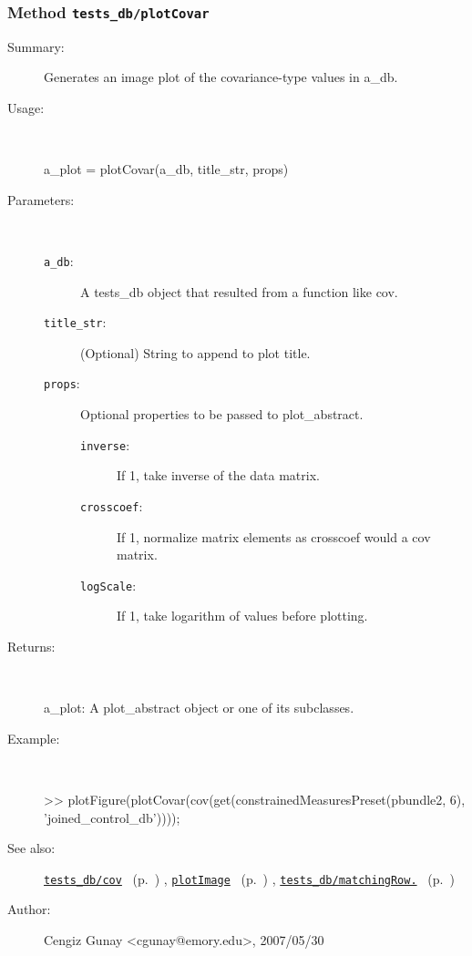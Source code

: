 \subsubsection[Method \texttt{plotCovar}]{Method \texttt{tests\_db/plotCovar}}%
%
\label{ref_tests_db__plotCovar}%
\hypertarget{ref_tests_db__plotCovar}{}%
\begin{description}
\item[Summary:]Generates an image plot of the covariance-type values in a\_db.
%
\item[Usage:]~%
\begin{lyxcode}%
a\_plot = plotCovar(a\_db, title\_str, props)
%
\end{lyxcode}%
%
%
\item[Parameters:]~
\begin{description}%
\item[\texttt{a\_db}:]
 A tests\_db object that resulted from a function like cov.
\item[\texttt{title\_str}:]
 (Optional) String to append to plot title.
\item[\texttt{props}:]
 Optional properties to be passed to plot\_abstract.
\begin{description}%
\item[\texttt{inverse}:]
 If 1, take inverse of the data matrix.
\item[\texttt{crosscoef}:]
 If 1, normalize matrix elements as crosscoef would a cov matrix.
\item[\texttt{logScale}:]
 If 1, take logarithm of values before plotting.
\end{description}%
\end{description}%
%
\item[Returns:]~

	a\_plot: A plot\_abstract object or one of its subclasses.
%
\item[Example:]~
\begin{lyxcode} >> plotFigure(plotCovar(cov(get(constrainedMeasuresPreset(pbundle2, 6), 'joined\_control\_db'))));\\%
\end{lyxcode}
%
\item[See also:]%
\hyperlink{ref_tests_db__cov}{\texttt{tests\_db/cov}}%
\ (p.~\pageref{ref_tests_db__cov})%
%
, \hyperlink{ref_plotImage}{\texttt{plotImage}}%
\ (p.~\pageref{ref_plotImage})%
%
, \hyperlink{ref_tests_db__matchingRow.}{\texttt{tests\_db/matchingRow.}}%
\ (p.~\pageref{ref_tests_db__matchingRow.})%
%
%
\item[Author:]%
Cengiz Gunay <cgunay@emory.edu>, 2007/05/30%
\end{description}
\methodline%
